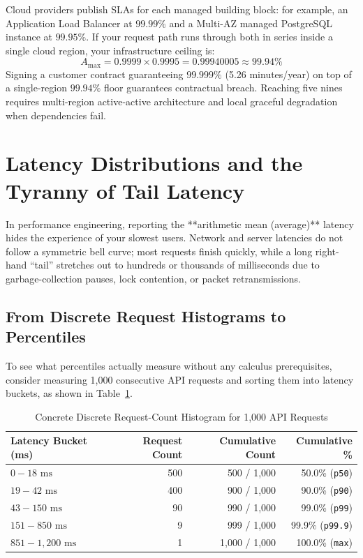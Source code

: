 \begin{productionwarningbox}
Cloud providers publish SLAs for each managed building block: for example, an Application Load Balancer at $99.99\%$ and a Multi-AZ managed PostgreSQL instance at $99.95\%$. If your request path runs through both in series inside a single cloud region, your infrastructure ceiling is:
$$A_{\text{max}} = 0.9999 \times 0.9995 = 0.99940005 \approx 99.94\%$$
Signing a customer contract guaranteeing $99.999\%$ (5.26 minutes/year) on top of a single-region $99.94\%$ floor guarantees contractual breach. Reaching five nines requires multi-region active-active architecture and local graceful degradation when dependencies fail.
\end{productionwarningbox}

\section{Latency Distributions and the Tyranny of Tail Latency}

In performance engineering, reporting the **arithmetic mean (average)** latency hides the experience of your slowest users. Network and server latencies do not follow a symmetric bell curve; most requests finish quickly, while a long right-hand ``tail'' stretches out to hundreds or thousands of milliseconds due to garbage-collection pauses, lock contention, or packet retransmissions.

\subsection{From Discrete Request Histograms to Percentiles}

To see what percentiles actually measure without any calculus prerequisites, consider measuring 1,000 consecutive API requests and sorting them into latency buckets, as shown in Table~\ref{tab:v5-ch01-histogram}.

\begin{table}[htbp]
\centering\small
\begin{tabular}{lrrr}
\toprule
\textbf{Latency Bucket (ms)} & \textbf{Request Count} & \textbf{Cumulative Count} & \textbf{Cumulative \%} \\
\midrule
$0 - 18\text{ ms}$ & 500 & 500 / 1,000 & 50.0\% (\texttt{p50}) \\
$19 - 42\text{ ms}$ & 400 & 900 / 1,000 & 90.0\% (\texttt{p90}) \\
$43 - 150\text{ ms}$ & 90 & 990 / 1,000 & 99.0\% (\texttt{p99}) \\
$151 - 850\text{ ms}$ & 9 & 999 / 1,000 & 99.9\% (\texttt{p99.9}) \\
$851 - 1,200\text{ ms}$ & 1 & 1,000 / 1,000 & 100.0\% (\texttt{max}) \\
\bottomrule
\end{tabular}
\caption{Concrete Discrete Request-Count Histogram for 1,000 API Requests}
\label{tab:v5-ch01-histogram}
\end{table}

